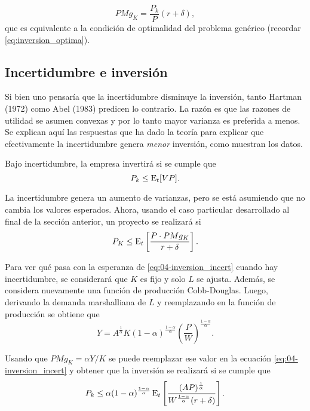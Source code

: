 \documentclass[DeGregorioResumen]{subfiles}
\begin{document}
\begin{equation}
PMg_K=\frac{P_k}{P}(r+\delta),
\end{equation}
que es equivalente a la condición de optimalidad del problema genérico (recordar \eqref{eq:inversion_optima}).

\subsection{Incertidumbre e inversión}

Si bien uno pensaría que la incertidumbre disminuye la inversión, tanto Hartman (1972) como Abel (1983) predicen lo contrario. La razón es que las razones de utilidad se asumen convexas y por lo tanto mayor varianza es preferida a menos. Se explican aquí las respuestas que ha dado la teoría para explicar que efectivamente la incertidumbre genera \emph{menor} inversión, como muestran los datos.

Bajo incertidumbre, la empresa invertirá si se cumple que
\begin{equation*}
P_k \leq \operatorname{E}_t[VP].
\end{equation*}

La incertidumbre genera un aumento de varianzas, pero se está asumiendo que no cambia los valores esperados. Ahora, usando el caso particular desarrollado al final de la sección anterior, un proyecto se realizará si
\begin{equation}
P_K \leq \operatorname{E}_t \left[\frac{P\cdot PMg_K}{r+\delta} \right].
\label{eq:04-inversion_incert}
\end{equation}

Para ver qué pasa con la esperanza de \eqref{eq:04-inversion_incert} cuando hay incertidumbre, se considerará que $K$ es fijo y solo $L$ se ajusta. Además, se considera nuevamente una función de producción Cobb-Douglas. Luego, derivando la demanda marshalliana de $L$ y reemplazando en la función de producción se obtiene que
\begin{equation*}
Y = A^{\frac{1}{\alpha}} K(1-\alpha)^{\frac{1-\alpha}{\alpha}} \left(\frac{P}{W} \right)^{\frac{1-\alpha}{\alpha}}.
\end{equation*}

Usando que $PMg_K=\alpha Y/K$ se puede reemplazar ese valor en la ecuación \eqref{eq:04-inversion_incert} y obtener que la inversión se realizará si se cumple que
\begin{equation}
P_k \leq \alpha(1-\alpha)^{\frac{1-\alpha}{\alpha}} \operatorname{E}_t \left[\frac{(AP)^{\frac{1}{\alpha}}}{W^{\frac{1-\alpha}{\alpha}}(r+\delta)}\right].
\end{equation}
\end{document}

